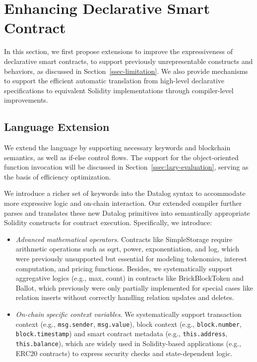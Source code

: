 \section{Enhancing Declarative Smart Contract}
\label{sec-enhancement}
In this section, we first propose extensions to improve the expressiveness of declarative smart contracts, to support previously unrepresentable constructs and behaviors, as discussed in Section~\ref{ssec-limitation}. We also provide mechanisms to support the efficient automatic translation from high-level declarative specifications to equivalent Solidity implementations through compiler-level improvements.


\subsection{Language Extension}

We extend the language by supporting necessary keywords and blockchain semantics, as well as if-else control flows. The support for the object-oriented function invocation will be discussed in Section~\ref{ssec:lazy-evaluation}, serving as the basis of efficiency optimization.

 We introduce a richer set of keywords into the Datalog syntax to accommodate more expressive logic and on-chain interaction.
Our extended compiler further parses and translates these new Datalog primitives into semantically appropriate Solidity constructs for contract execution.
Specifically, we introduce:
\begin{itemize}[leftmargin=0pt]
    \item {\em Advanced mathematical operators}. Contracts like {\sf SimpleStorage} require arithmetic operations such as {\sf sqrt}, {\sf power}, {\sf exponentiation}, and {\sf log}, which were previously unsupported but essential for modeling tokenomics, interest computation, and pricing functions. 
    Besides, we systematically support aggregative logics (e.g., {\sf max}, {\sf count}) in contracts like {\sf BrickBlockToken} and {\sf Ballot}, which previously were only partially implemented for special cases like relation inserts without correctly handling relation updates and deletes.
    \item {\em On-chain specific context variables}. We systematically support
transaction context (e.g., {\tt msg.sender}, {\tt msg.value}), block context (e.g., {\tt block.number}, {\tt block.timestamp}) and smart contract metadata (e.g., {\tt this.address}, {\tt this.balance}), which are widely used in Solidity-based applications (e.g., ERC20 contracts) to express security checks and state-dependent logic.
\end{itemize}

